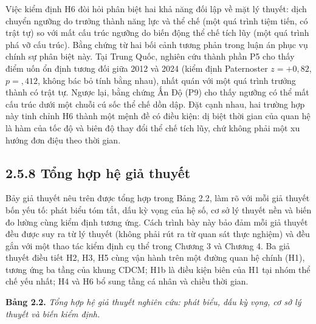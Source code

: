 \documentclass[
  a4paper,
  13pt]{extreport}
\begin{document}
Việc kiểm định H6 đòi hỏi phân biệt hai khả năng đối lập về mặt lý
thuyết: dịch chuyển ngưỡng do trưởng thành năng lực và thể chế (một quá
trình tiệm tiến, có trật tự) so với mất cấu trúc ngưỡng do biến động thể
chế tích lũy (một quá trình phá vỡ cấu trúc). Bằng chứng từ hai bối cảnh
tương phản trong luận án phục vụ chính sự phân biệt này. Tại Trung Quốc,
nghiên cứu thành phần P5 cho thấy điểm uốn ổn định tương đối giữa 2012
và 2024 (kiểm định Paternoster \(z = +0{,}82\), \(p = {,}412\), không
bác bỏ tính bằng nhau), nhất quán với một quá trình trưởng thành có trật
tự. Ngược lại, bằng chứng Ấn Độ (P9) cho thấy ngưỡng có thể mất cấu trúc
dưới một chuỗi cú sốc thể chế dồn dập. Đặt cạnh nhau, hai trường hợp này
tinh chỉnh H6 thành một mệnh đề có điều kiện: dị biệt thời gian của quan
hệ là hàm của tốc độ và biên độ thay đổi thể chế tích lũy, chứ không
phải một xu hướng đơn điệu theo thời gian.

\hypertarget{tux1ed5ng-hux1ee3p-hux1ec7-giux1ea3-thuyux1ebft}{%
\subsection{2.5.8 Tổng hợp hệ giả
thuyết}\label{tux1ed5ng-hux1ee3p-hux1ec7-giux1ea3-thuyux1ebft}}

Bảy giả thuyết nêu trên được tổng hợp trong Bảng 2.2, làm rõ với mỗi giả
thuyết bốn yếu tố: phát biểu tóm tắt, dấu kỳ vọng của hệ số, cơ sở lý
thuyết nền và biến đo lường cùng kiểm định tương ứng. Cách trình bày này
bảo đảm mỗi giả thuyết đều được suy ra từ lý thuyết (không phải rút ra
từ quan sát thực nghiệm) và đều gắn với một thao tác kiểm định cụ thể
trong Chương 3 và Chương 4. Ba giả thuyết điều tiết H2, H3, H5 cùng vận
hành trên một đường quan hệ chính (H1), tương ứng ba tầng của khung
CDCM; H1b là điều kiện biên của H1 tại nhóm thể chế yếu nhất; H4 và H6
bổ sung tầng cá nhân và chiều thời gian.

\textbf{Bảng 2.2.} \emph{Tổng hợp hệ giả thuyết nghiên cứu: phát biểu,
dấu kỳ vọng, cơ sở lý thuyết và biến kiểm định.}
\end{document}

